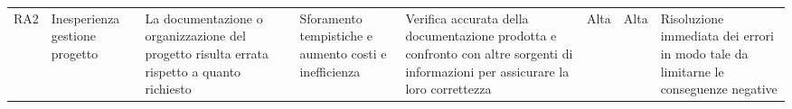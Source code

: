 \begin{landscape}
\begin{table}[h]
\begin{center}
\begin{tabular}{p{0.6cm}|p{1.8cm}|p{4cm}|p{2cm}|p{4cm}|p{0.9cm}|p{0.8cm}|p{4cm}}
RA2 & Inesperienza gestione progetto & La documentazione o organizzazione del progetto risulta errata rispetto a quanto richiesto & Sforamento tempistiche e aumento costi e inefficienza & Verifica accurata della documentazione prodotta e confronto con altre sorgenti di informazioni per assicurare la loro correttezza & Alta & Alta & Risoluzione immediata dei errori in modo tale da limitarne le conseguenze negative \\
                                                                                                                                                                                                                                 
\end{tabular}
\end{center}
\end{table}
\end{landscape}
